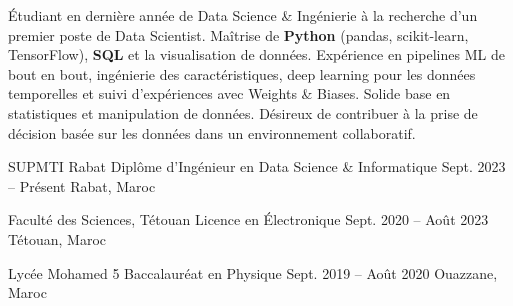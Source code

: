 \documentclass[11pt, a4paper]{awesome-cv}
\begin{document}
\makecvheader

\vspace{-0.8cm}

\begin{cvparagraph}
Étudiant en dernière année de Data Science \& Ingénierie à la recherche d'un premier poste de Data Scientist. Maîtrise de \textbf{Python} (pandas, scikit-learn, TensorFlow), \textbf{SQL} et la visualisation de données. Expérience en pipelines ML de bout en bout, ingénierie des caractéristiques, deep learning pour les données temporelles et suivi d'expériences avec Weights \& Biases. Solide base en statistiques et manipulation de données. Désireux de contribuer à la prise de décision basée sur les données dans un environnement collaboratif.
\end{cvparagraph}

\vspace{-0.6cm}
\vspace{0.2cm}
\cventry
  {SUPMTI Rabat}
  {Diplôme d'Ingénieur en Data Science \& Informatique}
  {Sept. 2023 -- Présent }
  {Rabat, Maroc}
  {}
  
\vspace{-0.5cm}
\cventry
  {Faculté des Sciences, Tétouan}
  {Licence en Électronique }
  {Sept. 2020 -- Août 2023}
  {Tétouan, Maroc}
  {}
  
\vspace{-0.5cm}
\cventry
  {Lycée Mohamed 5}
  {Baccalauréat en Physique}
  {Sept. 2019 -- Août 2020}
  {Ouazzane, Maroc}
  {}
  
\vspace{-0.4cm}
\end{document}
